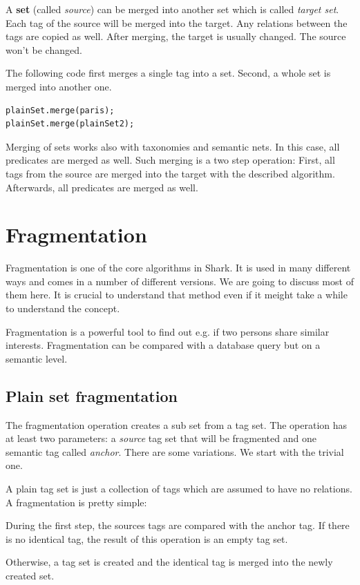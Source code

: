 A {\bf set} (called {\it source}) can be merged into another set which is called {\it target set}. Each tag of the source will be merged into the target. Any relations between the tags are copied as well. After merging, the target is usually changed. The source won't be changed.

The following code first merges a single tag into a set. Second, a whole set is merged into another one.

\begin{verbatim}
plainSet.merge(paris);
plainSet.merge(plainSet2);
\end{verbatim}

Merging of sets works also with taxonomies and semantic nets. In this case, all predicates are merged as well. Such merging is a two step operation: First, all tags from the source are merged into the target with the described algorithm. Afterwards, all predicates are merged as well. 

\section{Fragmentation}
Fragmentation is one of the core algorithms in Shark. It is used in many different ways and comes in a number of different versions. We are going to discuss most of them here. It is crucial to understand that method even if it meight take a while to understand the concept.

Fragmentation is a powerful tool to find out e.g. if two persons share similar interests. Fragmentation can be compared with a database query but on a semantic level.

\subsection{Plain set fragmentation}
The fragmentation operation creates a sub set from a tag set. The operation has at least two parameters: a {\it source} tag set that will be fragmented and one semantic tag called {\it anchor}. There are some variations. We start with the trivial one.

A plain tag set is just a collection of tags which are assumed to have no relations. A fragmentation is pretty simple:

During the first step, the sources tags are compared with the anchor tag. If there is no identical tag, the result of this operation is an empty tag set.

Otherwise, a tag set is created and the identical tag is merged into the newly created set.

